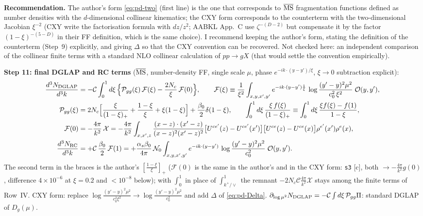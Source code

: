 \medskip
\noindent\textbf{Recommendation.} The author's form \eqref{eq:pd-two} (first line) is the one that corresponds to $\overline{\rm MS}$ fragmentation functions defined as number densities with the $d$-dimensional collinear kinematics; the CXY form corresponds to the counterterm with the two-dimensional Jacobian $\xi^{-2}$ (CXY write the factorisation formula with $dz/z^{2}$; AABKL App.~C use $\zeta^{-(D-2)}$ but compensate it by the factor $(1-\xi)^{-(5-D)}$ in their FF definition, which is the same choice). I recommend keeping the author's form, stating the definition of the counterterm (Step~9) explicitly, and giving $\Delta$ so that the CXY convention can be recovered. Not checked here: an independent comparison of the collinear finite terms with a standard NLO collinear calculation of $pp\to gX$ (that would settle the convention empirically).

\medskip
\noindent\textbf{Step 11: final DGLAP and RC terms} ($\overline{\rm MS}$, number-density FF, single scale $\mu$, phase $e^{-ik\cdot(y-y')/\xi}$, $\xi\to0$ subtraction explicit):
\begin{align}
\frac{d^{3}N_{\rm DGLAP}}{d^{3}k}&=-\mathcal{C}\int_{0}^{1}d\xi\,\Big\{\mathcal{P}_{gg}(\xi)\,\mathcal{F}(\xi)-\frac{2N_{c}}{\xi}\,\mathcal{F}(0)\Big\},\qquad
\mathcal{F}(\xi)\equiv\frac{1}{\xi^{2}}\int_{x,y,x',y'}e^{-ik\cdot(y-y')\frac{1}{\xi}}\,\log\frac{(y'-y)^{2}\mu^{2}}{c_{0}^{2}\,\xi^{2}}\;\mathcal{O}(y,y'),\notag\\
\mathcal{P}_{gg}(\xi)&=2N_{c}\Big[\frac{\xi}{(1-\xi)_{+}}+\frac{1-\xi}{\xi}+\xi(1-\xi)\Big]+\frac{\beta_{0}}{2}\delta(1-\xi),\qquad\int_{0}^{1}d\xi\,\frac{\xi\,f(\xi)}{(1-\xi)_{+}}\equiv\int_{0}^{1}d\xi\,\frac{\xi f(\xi)-f(1)}{1-\xi},\notag\\
\mathcal{F}(0)&=-\frac{4\pi}{k^{2}}\,\mathcal{X}=-\frac{4\pi}{k^{2}}\int_{x,x',z}\frac{(x-z)\cdot(x'-z)}{(x-z)^{2}(x'-z)^{2}}\big[U^{ce'}(z)-U^{ce'}(x')\big]\big[U^{ce}(z)-U^{ce}(x)\big]\rho^{e'}(x')\rho^{e}(x),\notag\\
\frac{d^{3}N_{\rm RC}}{d^{3}k}&=+\mathcal{C}\,\frac{\beta_{0}}{2}\,\mathcal{F}(1)=+\frac{\alpha_{s}\beta_{0}}{4\pi}\,\mathcal{N}_{0}\int_{x,y,x',y'}e^{-ik\cdot(y-y')}\,\log\frac{(y'-y)^{2}\mu^{2}}{c_{0}^{2}}\;\mathcal{O}(y,y').
\label{eq:pd-final}
\end{align}
The second term in the braces is the author's $[\frac{1-\xi}{\xi}]_{+}$ ($\mathcal{F}(0)$ is the same in the author's and in the CXY form: \texttt{s3} [c], both $\to-\frac{4\pi}{k^{2}}g(0)$, difference $4\times10^{-6}$ at $\xi=0.2$ and $<10^{-8}$ below); with $\int_{0}^{1}$ in place of $\int_{k^{+}/\vee}^{1}$ the remnant $-2N_{c}\mathcal{C}\frac{4\pi}{k^{2}}\mathcal{X}$ stays among the finite terms of Row~IV. CXY form: replace $\log\frac{(y'-y)^{2}\mu^{2}}{c_{0}^{2}\xi^{2}}\to\log\frac{(y'-y)^{2}\mu^{2}}{c_{0}^{2}}$ and add $\Delta$ of \eqref{eq:pd-Delta}. $\partial_{\log\mu^{2}}N_{\rm DGLAP}=-\mathcal{C}\int d\xi\,\mathcal{P}_{gg}\Pi$: standard DGLAP of $D_{g}(\mu)$.

